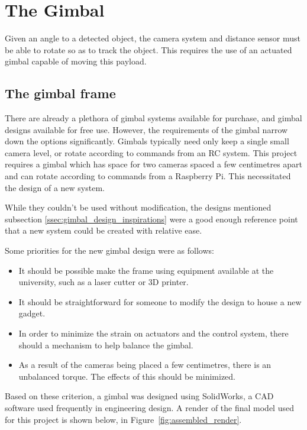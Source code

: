 \chapter{The Gimbal}
Given an angle to a detected object, the camera system and distance sensor must be able to rotate so as to track the object. This requires the use of an actuated gimbal capable of moving this payload.


\section{The gimbal frame}
There are already a plethora of gimbal systems available for purchase, and gimbal designs available for free use. However, the requirements of the gimbal narrow down the options significantly. Gimbals typically need only keep a single small camera level, or rotate according to commands from an RC system. This project requires a gimbal which has space for two cameras spaced a few centimetres apart and can rotate according to commands from a Raspberry Pi. This necessitated the design of a new system.

While they couldn't be used without modification, the designs mentioned subsection \ref{ssec:gimbal_design_inspirations} were a good enough reference point that a new system could be created with relative ease.

Some priorities for the new gimbal design were as follows:
%
\begin{itemize}
\item It should be possible make the frame using equipment available at the university, such as a laser cutter or 3D printer.
\item It should be straightforward for someone to modify the design to house a new gadget.
\item In order to minimize the strain on actuators and the control system, there should a mechanism to help balance the gimbal.
\item As a result of the cameras being placed a few centimetres, there is an unbalanced torque. The effects of this should be minimized.
\end{itemize}
%
Based on these criterion, a gimbal was designed using SolidWorks, a CAD software used frequently in engineering design. A render of the final model used for this project is shown below, in Figure~\ref{fig:assembled_render}.

